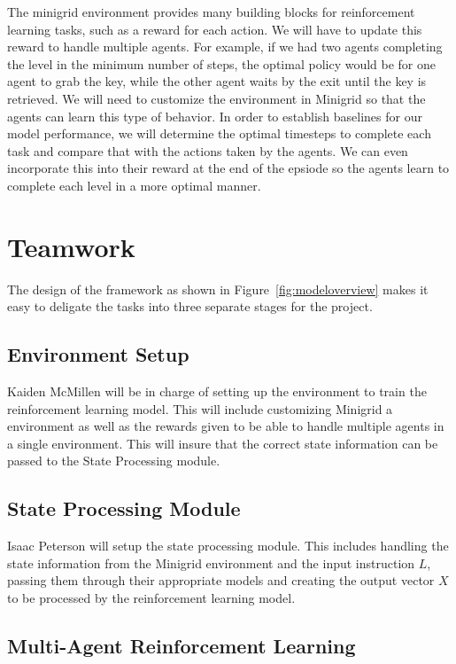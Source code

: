 \documentclass[11pt]{article}
\begin{document}
The minigrid environment provides many building blocks for reinforcement learning tasks, such as a reward for each action. We will have to update this reward to handle multiple agents. For example, if we had two agents completing the level in the minimum number of steps, the optimal policy would be for one agent to grab the key, while the other agent waits by the exit until the key is retrieved. We will need to customize the environment in Minigrid so that the agents can learn this type of behavior. In order to establish baselines for our model performance, we will determine the optimal timesteps to complete each task and compare that with the actions taken by the agents. We can even incorporate this into their reward at the end of the epsiode so the agents learn to complete each level in a more optimal manner.



\section{Teamwork}

The design of the framework as shown in Figure~\ref{fig:modeloverview} makes it easy to deligate the tasks into three separate stages for the project. 

\subsection{Environment Setup}

Kaiden McMillen will be in charge of setting up the environment to train the reinforcement learning model. This will include customizing Minigrid a environment as well as the rewards given to be able to handle multiple agents in a single environment. This will insure that the correct state information can be passed to the State Processing module.

\subsection{State Processing Module}
Isaac Peterson will setup the state processing module. This includes handling the state information from the Minigrid environment and the input instruction $L$, passing them through their appropriate models and creating the output vector $X$ to be processed by the reinforcement learning model. 

\subsection{Multi-Agent Reinforcement Learning}
\end{document}

